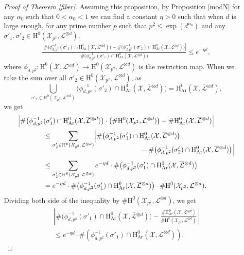 \documentclass[JEP,XML,SOM,Unicode,published]{cedram}
\theoremstyle{plain}
\theoremstyle{definition}
\newcommand{\ho}{\mathrm{H}}
\newcommand{\X}{\mathcal{X}}
\newcommand{\Li}{\overline{\mathcal{L}}{}}
\newcommand{\li}{\mathcal{L}}
\begin{document}
\begin{proof}[Proof of Theorem \ref{fiber}]
Assuming this proposition, by Proposition \ref{modN} for any $\alpha_0$ such that $0<\alpha_0<1$ we can find a constant $\eta>0$ such that when $d$ is large enough, for any prime number $p$ such that $p^2\leq \exp(d^{\alpha_0})$ and any $\sigma'_1,\sigma'_2\in \ho^0(\X_{p^2}, \li^{\otimes d})$,
\begin{align*}
\frac{\left| \#\bigl(\phi_{d,p^2}^{-1}(\sigma'_1)\cap \ho^0_{\mathrm{Ar}}(\X, \Li^{\otimes d}) \bigr)-\#\bigl(\phi_{d,p^2}^{-1}(\sigma'_2)\cap \ho^0_{\mathrm{Ar}}(\X, \Li^{\otimes d}) \bigr) \right|}{\#\bigl(\phi_{d,p^2}^{-1}(\sigma'_1)\cap \ho^0_{\mathrm{Ar}}(\X, \Li^{\otimes d}) \bigr)} \leq e^{-\eta d} ,
\end{align*}
where $\phi_{d,p^2}: \ho^0(\X, \Li^{\otimes d}) \to \ho^0(\X_{p^2}, \li^{\otimes d})$ is the restriction map.
When we take the sum over all $\sigma'_2\in \ho^0(\X_{p^2}, \li^{\otimes d})$, as
\[
\bigcup_{\sigma'_2\in \ho^0(\X_{p^2}, \li^{\otimes d})} \bigl(\phi_{d,p^2}^{-1}(\sigma'_2)\cap \ho^0_{\mathrm{Ar}}(\X, \Li^{\otimes d}) \bigr)= \ho^0_{\mathrm{Ar}}(\X, \Li^{\otimes d}),
\]
we get
\begin{align*}
\Bigl| \#\bigl(\phi_{d,p^2}^{-1}&(\sigma'_1)\cap \ho^0_{\mathrm{Ar}}(\X, \Li^{\otimes d}) \bigr)\cdot \left(\# \ho^0(\X_{p^2}, \li^{\otimes d}) \right)-\# \ho^0_{\mathrm{Ar}}(\X, \Li^{\otimes d}) \Bigr| \\
&\leq \sum_{\sigma'_2\in \ho^0(\X_{p^2}, \li^{\otimes d})}\Bigl| \#\bigl(\phi_{d,p^2}^{-1}(\sigma'_1)\cap \ho^0_{\mathrm{Ar}}(\X, \Li^{\otimes d}) \bigr)\\[-12pt]
&\hspace*{5cm}-\#\bigl(\phi_{d,p^2}^{-1}(\sigma'_2)\cap \ho^0_{\mathrm{Ar}}(\X, \Li^{\otimes d}) \bigr) \Bigr|\\[2pt]
&\leq \sum_{\sigma'_2\in \ho^0(\X_{p^2}, \li^{\otimes d})} e^{-\eta d}\cdot \#\bigl(\phi_{d,p^2}^{-1}(\sigma'_1)\cap \ho^0_{\mathrm{Ar}}(\X, \Li^{\otimes d}) \bigr)\\
&= e^{-\eta d}\cdot \#\bigl(\phi_{d,p^2}^{-1}(\sigma'_1)\cap \ho^0_{\mathrm{Ar}}(\X, \Li^{\otimes d}) \bigr)\cdot \#\ho^0(\X_{p^2}, \li^{\otimes d}).
\end{align*}
Dividing both side of the inequality by $\#\ho^0(\X_{p^2}, \li^{\otimes d})$, we get
\begin{multline*}
\left| \#\bigl(\phi_{d,p^2}^{-1}(\sigma'_1)\cap \ho^0_{\mathrm{Ar}}(\X, \Li^{\otimes d}) \bigr)-\frac{\#\ho^0_{\mathrm{Ar}}(\X, \Li^{\otimes d})}{\#\ho^0(\X_{p^2}, \li^{\otimes d})} \right|\\
\leq e^{-\eta d}\cdot \#\left(\phi_{d,p^2}^{-1}(\sigma'_1)\cap \ho^0_{\mathrm{Ar}}(\X, \li^{\otimes d}) \right).
\end{multline*}


\end{proof}
\end{document}
